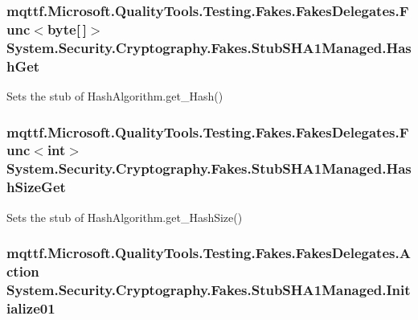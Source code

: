 \hypertarget{class_system_1_1_security_1_1_cryptography_1_1_fakes_1_1_stub_s_h_a1_managed_a92543470f9e739eb740f6337ddf19a54}{
\subsubsection[{Hash\-Get}]{\setlength{\rightskip}{0pt plus 5cm}mqttf.\-Microsoft.\-Quality\-Tools.\-Testing.\-Fakes.\-Fakes\-Delegates.\-Func$<$byte\mbox{[}$\,$\mbox{]}$>$ System.\-Security.\-Cryptography.\-Fakes.\-Stub\-S\-H\-A1\-Managed.\-Hash\-Get}}\label{class_system_1_1_security_1_1_cryptography_1_1_fakes_1_1_stub_s_h_a1_managed_a92543470f9e739eb740f6337ddf19a54}


Sets the stub of Hash\-Algorithm.\-get\-\_\-\-Hash()

\hypertarget{class_system_1_1_security_1_1_cryptography_1_1_fakes_1_1_stub_s_h_a1_managed_a45a5e1bbfc89f92d4656c5fc7dc78ee1}{
\subsubsection[{Hash\-Size\-Get}]{\setlength{\rightskip}{0pt plus 5cm}mqttf.\-Microsoft.\-Quality\-Tools.\-Testing.\-Fakes.\-Fakes\-Delegates.\-Func$<$int$>$ System.\-Security.\-Cryptography.\-Fakes.\-Stub\-S\-H\-A1\-Managed.\-Hash\-Size\-Get}}\label{class_system_1_1_security_1_1_cryptography_1_1_fakes_1_1_stub_s_h_a1_managed_a45a5e1bbfc89f92d4656c5fc7dc78ee1}


Sets the stub of Hash\-Algorithm.\-get\-\_\-\-Hash\-Size()

\hypertarget{class_system_1_1_security_1_1_cryptography_1_1_fakes_1_1_stub_s_h_a1_managed_aeefea971eff3fd70c5cb6893564f5ac6}{
\subsubsection[{Initialize01}]{\setlength{\rightskip}{0pt plus 5cm}mqttf.\-Microsoft.\-Quality\-Tools.\-Testing.\-Fakes.\-Fakes\-Delegates.\-Action System.\-Security.\-Cryptography.\-Fakes.\-Stub\-S\-H\-A1\-Managed.\-Initialize01}}\label{class_system_1_1_security_1_1_cryptography_1_1_fakes_1_1_stub_s_h_a1_managed_aeefea971eff3fd70c5cb6893564f5ac6}


